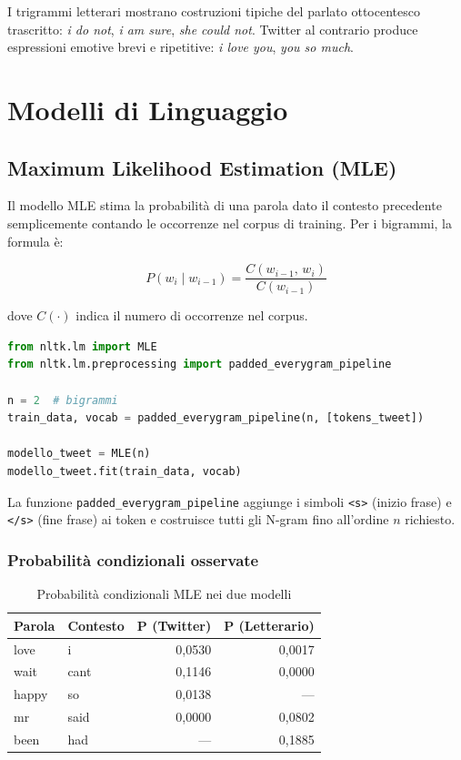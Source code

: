 \documentclass[12pt, a4paper]{article}
\begin{document}
I trigrammi letterari mostrano costruzioni tipiche del parlato
ottocentesco trascritto: \textit{i do not}, \textit{i am sure},
\textit{she could not}. Twitter al contrario produce espressioni
emotive brevi e ripetitive: \textit{i love you}, \textit{you so much}.

\section{Modelli di Linguaggio}

\subsection{Maximum Likelihood Estimation (MLE)}

Il modello MLE stima la probabilità di una parola dato il contesto
precedente semplicemente contando le occorrenze nel corpus di training.
Per i bigrammi, la formula è:

\begin{equation}
P(w_i \mid w_{i-1}) = \frac{C(w_{i-1},\, w_i)}{C(w_{i-1})}
\end{equation}

dove $C(\cdot)$ indica il numero di occorrenze nel corpus.

\begin{lstlisting}[language=Python, caption=Addestramento del modello MLE]
from nltk.lm import MLE
from nltk.lm.preprocessing import padded_everygram_pipeline

n = 2  # bigrammi
train_data, vocab = padded_everygram_pipeline(n, [tokens_tweet])

modello_tweet = MLE(n)
modello_tweet.fit(train_data, vocab)
\end{lstlisting}

La funzione \texttt{padded\_everygram\_pipeline} aggiunge i simboli
\texttt{<s>} (inizio frase) e \texttt{</s>} (fine frase) ai token
e costruisce tutti gli N-gram fino all'ordine $n$ richiesto.

\subsubsection{Probabilità condizionali osservate}

\begin{table}[H]
\centering
\begin{tabular}{llrr}
\toprule
\textbf{Parola} & \textbf{Contesto} &
\textbf{P (Twitter)} & \textbf{P (Letterario)} \\
\midrule
love  & i    & 0,0530 & 0,0017 \\
wait  & cant & 0,1146 & 0,0000 \\
happy & so   & 0,0138 & ---    \\
mr    & said & 0,0000 & 0,0802 \\
been  & had  & ---    & 0,1885 \\
\bottomrule
\end{tabular}
\caption{Probabilità condizionali MLE nei due modelli}
\end{table}
\end{document}
